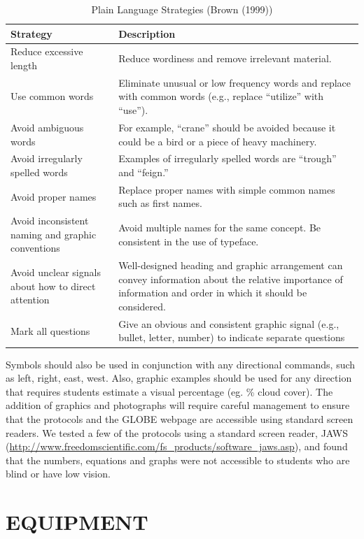 \documentclass[11.5pt]{sig-alternate} %
\begin{document}
\begin{large}
\begin{table}[thp]
\caption{Plain Language Strategies (Brown (1999))}
\begin{tabular}{|l|l|}
\hline
\textbf{Strategy} & \textbf{Description} \\ \hline
Reduce excessive length & Reduce wordiness and remove irrelevant material. \\ \hline
Use common words & Eliminate unusual or low frequency words and replace with common words (e.g., replace “utilize” with “use”). \\ \hline
Avoid ambiguous words & For example, “crane” should be avoided because it could be a bird 
or a piece of heavy machinery. \\ \hline
Avoid irregularly spelled words & Examples of irregularly spelled words are “trough” and “feign.” \\ \hline
Avoid proper names & Replace proper names with simple common names such as first 
names. \\ \hline
Avoid inconsistent naming and graphic conventions & Avoid multiple names for the same concept. Be consistent in the use of typeface. \\ \hline
Avoid unclear signals about how to direct attention & Well-designed heading and graphic arrangement can convey information about the relative importance of information and order in which it should be considered. \\ \hline
Mark all questions & Give an obvious and consistent graphic signal (e.g., bullet, letter, 
number) to indicate separate questions \\ \hline
\end{tabular}
\end{table}

Symbols should also be used in conjunction with any directional commands, such as left, right, east, west. Also, graphic examples should be used for any direction that requires students estimate a visual percentage (eg. \% cloud cover). The addition of graphics and photographs will require careful management to ensure that the protocols and the GLOBE webpage are accessible using standard screen readers. We tested a few of the protocols using a standard screen reader, JAWS (\url{http://www.freedomscientific.com/fs\_products/software\_jaws.asp}), and found that the numbers, equations and graphs were not accessible to students who are blind or have low vision. 

\section*{EQUIPMENT}


\end{large}
\end{document}
